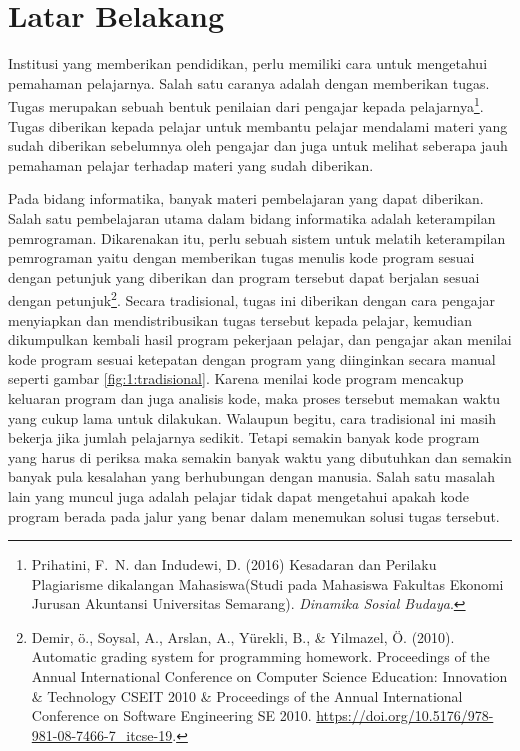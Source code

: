 \documentclass[a4paper,twoside]{article}
\begin{document}
\section{Latar Belakang}

Institusi yang memberikan pendidikan, perlu memiliki cara untuk mengetahui pemahaman pelajarnya. Salah satu caranya adalah dengan memberikan tugas. Tugas merupakan sebuah bentuk penilaian dari pengajar kepada pelajarnya\footnote{Prihatini, F.~N. dan Indudewi, D. (2016) {Kesadaran dan Perilaku Plagiarisme dikalangan Mahasiswa(Studi pada Mahasiswa Fakultas Ekonomi Jurusan Akuntansi Universitas Semarang)}.
{\em Dinamika Sosial Budaya}.}. Tugas diberikan kepada pelajar untuk membantu pelajar mendalami materi yang sudah diberikan sebelumnya oleh pengajar dan juga untuk melihat seberapa jauh pemahaman pelajar terhadap materi yang sudah diberikan.

Pada bidang informatika, banyak materi pembelajaran yang dapat diberikan. Salah satu pembelajaran utama dalam bidang informatika adalah keterampilan pemrograman. Dikarenakan itu, perlu sebuah sistem untuk melatih keterampilan pemrograman yaitu dengan memberikan tugas menulis kode program sesuai dengan petunjuk yang diberikan dan program tersebut dapat berjalan sesuai dengan petunjuk\footnote{
	Demir, \"o., Soysal, A., Arslan, A., Y\"urekli, B., \& Yilmazel, \"O. (2010). Automatic grading system for programming homework.
	Proceedings of the Annual International Conference on Computer Science Education: Innovation \& Technology CSEIT 2010 \&  Proceedings of the Annual International Conference on Software Engineering SE 2010. \url{https://doi.org/10.5176/978-981-08-7466-7_itcse-19}.
}.
Secara tradisional, tugas ini diberikan dengan cara pengajar menyiapkan dan mendistribusikan tugas tersebut kepada pelajar, kemudian dikumpulkan kembali hasil program pekerjaan pelajar, dan pengajar akan menilai kode program sesuai ketepatan dengan program yang diinginkan secara manual seperti gambar \ref{fig:1:tradisional}. Karena menilai kode program mencakup keluaran program dan juga analisis kode, maka proses tersebut memakan waktu yang cukup lama untuk dilakukan. Walaupun begitu, cara tradisional ini masih bekerja jika jumlah pelajarnya sedikit.
Tetapi semakin banyak kode program yang harus di periksa maka semakin banyak waktu yang dibutuhkan dan semakin banyak pula kesalahan yang berhubungan dengan manusia. Salah satu masalah lain yang muncul juga adalah pelajar tidak dapat mengetahui apakah kode program berada pada jalur yang benar dalam menemukan solusi tugas tersebut.
\end{document}
